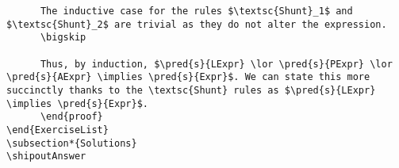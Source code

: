 \documentclass{book}
\begin{document}
\begin{verbatim}
      The inductive case for the rules $\textsc{Shunt}_1$ and $\textsc{Shunt}_2$ are trivial as they do not alter the expression.
      \bigskip
      
      Thus, by induction, $\pred{s}{LExpr} \lor \pred{s}{PExpr} \lor \pred{s}{AExpr} \implies \pred{s}{Expr}$. We can state this more succinctly thanks to the \textsc{Shunt} rules as $\pred{s}{LExpr} \implies \pred{s}{Expr}$.
      \end{proof}
\end{ExerciseList}
\subsection*{Solutions}
\shipoutAnswer
      

\end{verbatim}
\end{document}

